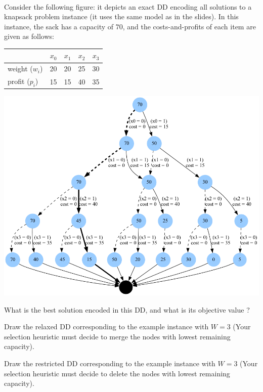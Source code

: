 \documentclass[12pt]{report}
\newcommand{\answerbox}[2]{\hfill\break\\
	\framebox[\linewidth]{\parbox[c][#1][c]{\dimexpr\linewidth-2\fboxsep-2\fboxrule}{#2}}
}
\begin{document}
	\begin{Exercise}[title={Application to Knapsack}]\\
		Consider the following figure: it depicts an exact DD encoding all solutions to a knapsack problem instance (it uses the same model as in the slides). In this instance, the sack has a capacity of $70$, and the costs-and-profits of each item are given as follows:
		\begin{center}
			\begin{tabular}{| l | r | r | r | r | }
				\hline
				&$x_0$ &$x_1$&$x_2$ &$x_3$ \\
				\hline
				weight ($w_i$) &       20 &     20 &      25  &       30 \\
				profit    ($p_i$) &      15  &      15 &       40 &       35 \\
				\hline
			\end{tabular}

			\vspace*{1.5cm}
			\includegraphics*[width=.9\textwidth]{kp_exact.png}
		\end{center}

		\vspace*{1.5cm}
		\Question What is the best solution encoded in this DD, and what is its objective value ?
		\answerbox{3cm}{
		}

		\newpage
		\Question Draw the relaxed DD corresponding to the example instance with $W = 3$ (Your selection heuristic must decide to merge the nodes with lowest remaining capacity).
		\answerbox{20cm}{
		}

		\newpage
		\Question Draw the restricted DD corresponding to the example instance with $W = 3$  (Your selection heuristic must decide to delete the nodes with lowest remaining capacity).
		\answerbox{20cm}{
		}
	\end{Exercise}
\end{document}
